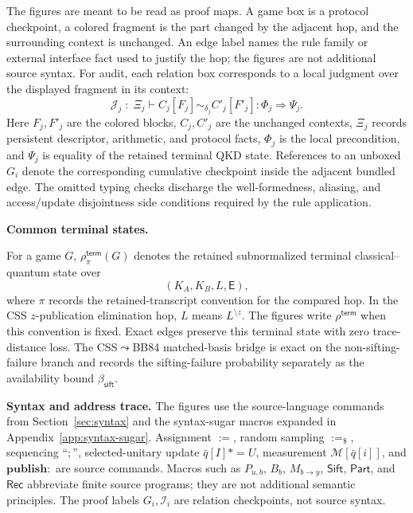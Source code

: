 \documentclass[conference,compsoc]{IEEEtran}
\newcommand{\bb}{\textsf{BB84}\xspace}
\newcommand{\asteq}{\mathrel{*\!=}}
\begin{document}
The figures are meant to be read as proof maps. A game box is a protocol
checkpoint, a colored fragment is the part changed by the adjacent hop, and the
surrounding context is unchanged. An edge label names the rule family or
external interface fact used to justify the hop; the figures are not additional
source syntax. For audit, each relation box corresponds to a local judgment over
the displayed fragment in its context:
\[
\mathcal J_j\;:\;
\Xi_j
\vdash C_j[F_j]\sim_{\delta_j}C'_j[F'_j]:
\Phi_j\Longrightarrow\Psi_j .
\]
Here \(F_j,F'_j\) are the colored blocks, \(C_j,C'_j\) are the unchanged
contexts, \(\Xi_j\) records persistent descriptor, arithmetic, and protocol
facts, \(\Phi_j\) is the local precondition, and \(\Psi_j\) is equality of the
retained terminal QKD state. References to an unboxed \(G_i\) denote the
corresponding cumulative checkpoint inside the adjacent bundled edge. The
omitted typing checks discharge the well-formedness, aliasing, and access/update
disjointness side conditions required by the rule application.

\smallskip\noindent\textbf{Common terminal states.}

For a game \(G\), \(\rho^{\mathsf{term}}_{\pi}(G)\) denotes the retained
subnormalized terminal classical--quantum state over
\[
(K_A,K_B,L,\mathsf E),
\]
where \(\pi\) records the retained-transcript convention for the compared hop.
In the CSS \(z\)-publication elimination hop, \(L\) means \(L^{\setminus z}\).
The figures write \(\rho^{\mathsf{term}}\) when this convention is fixed.
Exact edges preserve this terminal state with zero trace-distance loss. The
CSS\(\leadsto\)\bb matched-basis bridge is exact on the non-sifting-failure
branch and records the sifting-failure probability separately as the
availability bound \(\beta_{\mathsf{sift}}\).

\smallskip\noindent\textbf{Syntax and address trace.}
The figures use the source-language commands from Section~\ref{sec:syntax} and
the syntax-sugar macros expanded in Appendix~\ref{app:syntax-sugar}.
Assignment $:=$, random sampling $:=_\$$, sequencing ``$;$'', selected-unitary
update $\bar q[I]\asteq U$, measurement \(\mathcal M[\bar q[i]]\), and
\(\mathbf{publish:}\) are source commands. Macros such as \(P_{u,b}\),
\(B_b\), \(M_{b\to y}\), \(\mathsf{Sift}\), \(\mathsf{Part}\), and
\(\mathsf{Rec}\) abbreviate finite source programs; they are not additional
semantic principles. The proof labels \(G_i,\mathcal I_i\) are relation
checkpoints, not source syntax.
\end{document}
